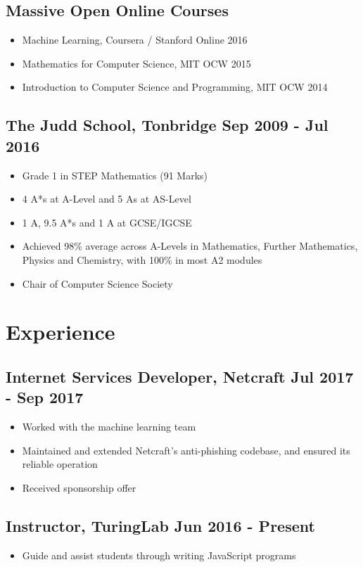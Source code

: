 \documentclass[a4paper, 8pt]{extarticle}
\begin{document}
\begin{minipage}[t]{.66\textwidth}
\subsection*{Massive Open Online Courses}
\begin{itemize}
	\item Machine Learning, Coursera / Stanford Online \hfill 2016
	\item Mathematics for Computer Science, MIT OCW \hfill 2015
	\item Introduction to Computer Science and Programming, MIT OCW \hfill 2014
\end{itemize}

\subsection*{The Judd School, Tonbridge \hfill Sep 2009 - Jul 2016}
\begin{itemize}
	\item Grade 1 in STEP Mathematics (91 Marks)
	\item 4 A*s at A-Level and 5 As at AS-Level
	\item 1 A$\hat{}$, 9.5 A*s and 1 A at GCSE/IGCSE
	\item Achieved 98\% average across A-Levels in Mathematics, Further Mathematics, Physics and Chemistry, with 100\% in most A2 modules
	\item Chair of Computer Science Society
\end{itemize}


\section*{Experience}

\subsection*{Internet Services Developer, Netcraft \hfill Jul 2017 - Sep 2017}
\begin{itemize}
	\item Worked with the machine learning team
	\item Maintained and extended Netcraft's anti-phishing codebase, and ensured its reliable operation
	\item Received sponsorship offer
\end{itemize}

\subsection*{Instructor, TuringLab \hfill Jun 2016 - Present}
\begin{itemize}
	\item Guide and assist students through writing JavaScript programs
\end{itemize}


\end{minipage}
\end{document}
